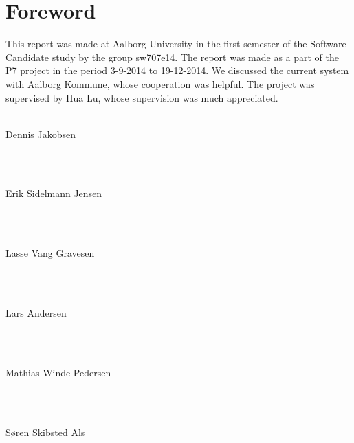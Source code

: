 \thispagestyle{empty}
\section*{Foreword}
\noindent This report was made at Aalborg University in the first semester of the Software Candidate study by the group sw707e14. 
The report was made as a part of the P7 project in the period 3-9-2014 to 19-12-2014. 
We discussed the current system with Aalborg Kommune, whose cooperation was helpful. 
The project was supervised by Hua Lu, whose supervision was much appreciated. \\ \\

\noindent
\vspace{5mm}
\parbox[h]{4cm}{Dennis Jakobsen}\hspace{0.5cm} \makebox[7cm]{\hrulefill} \\ \\
\vspace{5mm}
\parbox[h]{4cm}{Erik Sidelmann Jensen}\hspace{0.5cm} \makebox[7cm]{\hrulefill} \\ \\
\vspace{5mm}
\parbox[h]{4cm}{Lasse Vang Gravesen}\hspace{0.5cm} \makebox[7cm]{\hrulefill} \\ \\
\vspace{5mm}
\parbox[h]{4cm}{Lars Andersen}\hspace{0.5cm} \makebox[7cm]{\hrulefill} \\ \\
\vspace{5mm}
\parbox[h]{4cm}{Mathias Winde Pedersen}\hspace{0.5cm} \makebox[7cm]{\hrulefill} \\ \\
\vspace{5mm}
\parbox[h]{4cm}{Søren Skibsted Als}\hspace{0.5cm} \makebox[7cm]{\hrulefill} \\ \\

\newpage